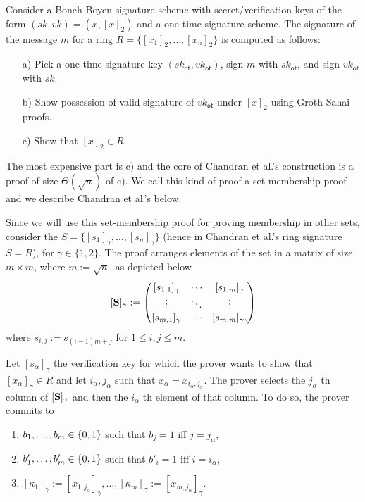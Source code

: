 

Consider a {Boneh-Boyen signature scheme} with secret/verification keys of the form $(sk,vk)=(x,[x]_2)$ and a {one-time signature scheme}. The signature of the message $m$ for a ring $R=\{[x_1]_2,\ldots,[x_n]_2\}$ is computed as follows:
\begin{itemize}
	\item[a)] Pick a one-time signature key $(sk_\mathsf{ot},vk_\mathsf{ot})$, sign $m$ with $sk_\mathsf{ot}$, and sign $vk_\mathsf{ot}$ with $sk$.
	\item[b)] Show possession of valid signature of $vk_\mathsf{ot}$ under $[x]_2$ using Groth-Sahai proofs.
	\item[c)] Show that $[x]_2\in R$.
\end{itemize}
The most expensive part is c) and the core of Chandran et al.'s construction is a proof of size $\Theta(\sqrt{n})$ of c). We call this kind of proof a set-membership proof and we describe Chandran et al.'s below.

Since we will use this set-membership proof for proving membership in other sets, consider the $S = \{[s_1]_\gamma,\ldots,[s_n]_\gamma\}$ (hence in Chandran et al.'s ring signature $S=R$), for $\gamma\in\{1,2\}$.
The proof arranges elements of the set in a matrix of size $m\times m$, where $m:=\sqrt{n}$, as depicted below
$$
[\mathbf{{S}}]_\gamma:=
\begin{pmatrix}
[s_{1,1}]_\gamma & \cdots & [s_{1,m}]_\gamma\\
\vdots     & \ddots & \vdots \\
[s_{m,1}]_\gamma  & \cdots & [s_{m,m}]_\gamma,
\end{pmatrix}
$$
where $s_{i,j}:=s_{(i-1)m+j}$ for $1\leq i,j \leq m$.

Let $[s_\alpha]_\gamma$ the verification key for which the prover wants to show that $[x_\alpha]_\gamma\in R$ and let $i_\alpha,j_\alpha$ such that $x_\alpha = x_{i_\alpha,j_\alpha}$. The prover selects the $j_\alpha$ th column of $[\mathbf{{S}}]_\gamma$ and then the $i_\alpha$ th element of that column. To do so, the prover commits to 
\begin{enumerate}
\item $b_1,\ldots,b_m\in\{0,1\}$ such that $b_j=1$ iff $j=j_\alpha$,
\item $b'_1,\ldots,b'_m\in\{0,1\}$ such that $b'_i=1$ iff $i=i_\alpha$,
\item $[\kappa_1]_\gamma:=[x_{1,j_\alpha}]_\gamma,\ldots,[\kappa_m]_\gamma:=[x_{m,j_\alpha}]_\gamma$.
\end{enumerate}


